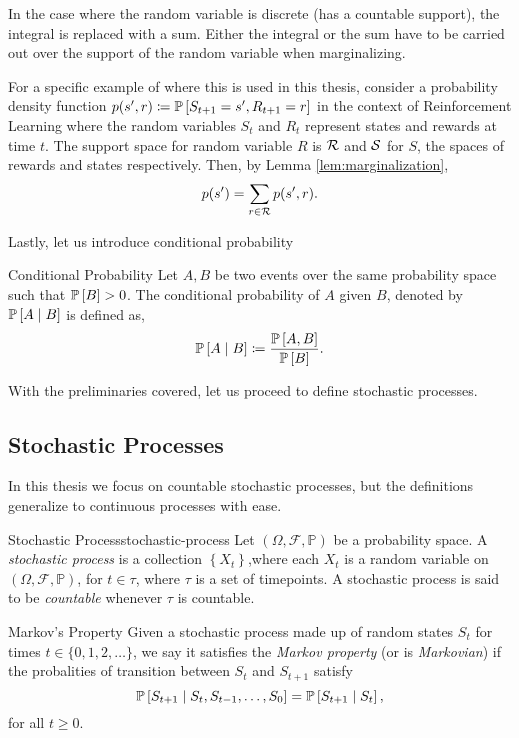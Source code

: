 In the case where the random variable is discrete (has a countable support), the
integral is replaced with a sum. Either the integral or the sum have to be
carried out over the support of the random variable when marginalizing.

For a specific example of where this is used in this thesis, consider a
probability density function $p(s', r) \coloneqq \mathbb{P}\left[S_{t+1} = s', R_{t+1} = r\right]$
in the context of Reinforcement Learning where the random variables $S_t$ and
$R_t$ represent states and rewards at time $t$. The support space for random
variable $R$ is $\mathcal{R}$ and $\mathcal{S}$ for $S$, the spaces of rewards and
states respectively. Then, by Lemma
\ref{lem:marginalization},
\[
    p(s') = \sum_{r \in \mathcal{R}} p(s', r).
\] 

Lastly, let us introduce conditional probability

\begin{dfn}{Conditional Probability}{}
    Let $A, B$ be two events over the same probability space such that $\mathbb{P}\left[B\right] >
    0$. The conditional probability of $A$ given $B$, denoted by $\mathbb{P}\left[A \mid B\right]$
    is defined as,
    \begin{equation}
        \mathbb{P}\left[A \mid B\right] \coloneqq \frac{\mathbb{P}\left[A, B\right]}{\mathbb{P}\left[B\right]}.
    \end{equation}
\end{dfn}

With the preliminaries covered, let us proceed to define stochastic processes.

\subsection{Stochastic Processes}

In this thesis we focus on countable stochastic processes, but the definitions
generalize to continuous processes with ease.

\begin{dfn}{Stochastic Process}{stochastic-process}
    Let $(\Omega, \mathcal{F}, \mathbb{P})$ be a probability space. A
    \emph{stochastic process} is a collection $\left\{ X_t \right\}$,where each
    $X_t$ is a random variable on $(\Omega, \mathcal{F}, \mathbb{P})$, for $t
    \in \tau$, where $\tau$ is a set of timepoints. A stochastic process is said
    to be \emph{countable} whenever $\tau$ is countable.
\end{dfn}

\begin{dfn}{Markov's Property}{}
    Given a stochastic process made up of random states $S_t$ for times $t \in
    \{0, 1, 2, \dots\}$, we say it satisfies the \emph{Markov property} (or is
    \emph{Markovian}) if the probalities of transition between $S_t$ and
    $S_{t+1}$ satisfy
    \[
        \mathbb{P}\left[S_{t+1} \mid S_t, S_{t-1}, \dots, S_0 \right] = \mathbb{P}\left[S_{t+1} \mid S_t\right],
    \]
    for all $t \geq 0$.
\end{dfn}

